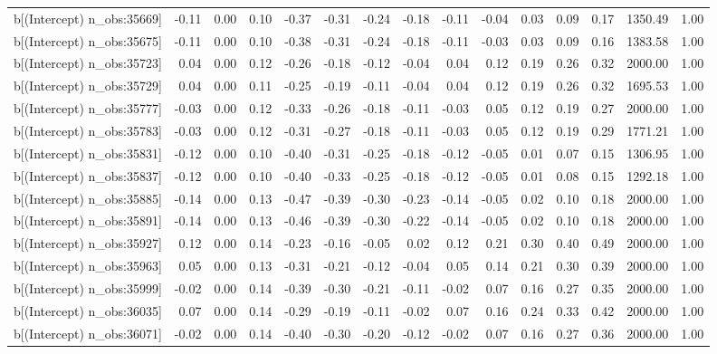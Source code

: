 \begin{table}[ht]
\begin{tabular}{rrrrrrrrrrrrrrr}
  b[(Intercept) n\_obs:35669] & -0.11 & 0.00 & 0.10 & -0.37 & -0.31 & -0.24 & -0.18 & -0.11 & -0.04 & 0.03 & 0.09 & 0.17 & 1350.49 & 1.00 \\ 
  b[(Intercept) n\_obs:35675] & -0.11 & 0.00 & 0.10 & -0.38 & -0.31 & -0.24 & -0.18 & -0.11 & -0.03 & 0.03 & 0.09 & 0.16 & 1383.58 & 1.00 \\ 
  b[(Intercept) n\_obs:35723] & 0.04 & 0.00 & 0.12 & -0.26 & -0.18 & -0.12 & -0.04 & 0.04 & 0.12 & 0.19 & 0.26 & 0.32 & 2000.00 & 1.00 \\ 
  b[(Intercept) n\_obs:35729] & 0.04 & 0.00 & 0.11 & -0.25 & -0.19 & -0.11 & -0.04 & 0.04 & 0.12 & 0.19 & 0.26 & 0.32 & 1695.53 & 1.00 \\ 
  b[(Intercept) n\_obs:35777] & -0.03 & 0.00 & 0.12 & -0.33 & -0.26 & -0.18 & -0.11 & -0.03 & 0.05 & 0.12 & 0.19 & 0.27 & 2000.00 & 1.00 \\ 
  b[(Intercept) n\_obs:35783] & -0.03 & 0.00 & 0.12 & -0.31 & -0.27 & -0.18 & -0.11 & -0.03 & 0.05 & 0.12 & 0.19 & 0.29 & 1771.21 & 1.00 \\ 
  b[(Intercept) n\_obs:35831] & -0.12 & 0.00 & 0.10 & -0.40 & -0.31 & -0.25 & -0.18 & -0.12 & -0.05 & 0.01 & 0.07 & 0.15 & 1306.95 & 1.00 \\ 
  b[(Intercept) n\_obs:35837] & -0.12 & 0.00 & 0.10 & -0.40 & -0.33 & -0.25 & -0.18 & -0.12 & -0.05 & 0.01 & 0.08 & 0.15 & 1292.18 & 1.00 \\ 
  b[(Intercept) n\_obs:35885] & -0.14 & 0.00 & 0.13 & -0.47 & -0.39 & -0.30 & -0.23 & -0.14 & -0.05 & 0.02 & 0.10 & 0.18 & 2000.00 & 1.00 \\ 
  b[(Intercept) n\_obs:35891] & -0.14 & 0.00 & 0.13 & -0.46 & -0.39 & -0.30 & -0.22 & -0.14 & -0.05 & 0.02 & 0.10 & 0.18 & 2000.00 & 1.00 \\ 
  b[(Intercept) n\_obs:35927] & 0.12 & 0.00 & 0.14 & -0.23 & -0.16 & -0.05 & 0.02 & 0.12 & 0.21 & 0.30 & 0.40 & 0.49 & 2000.00 & 1.00 \\ 
  b[(Intercept) n\_obs:35963] & 0.05 & 0.00 & 0.13 & -0.31 & -0.21 & -0.12 & -0.04 & 0.05 & 0.14 & 0.21 & 0.30 & 0.39 & 2000.00 & 1.00 \\ 
  b[(Intercept) n\_obs:35999] & -0.02 & 0.00 & 0.14 & -0.39 & -0.30 & -0.21 & -0.11 & -0.02 & 0.07 & 0.16 & 0.27 & 0.35 & 2000.00 & 1.00 \\ 
  b[(Intercept) n\_obs:36035] & 0.07 & 0.00 & 0.14 & -0.29 & -0.19 & -0.11 & -0.02 & 0.07 & 0.16 & 0.24 & 0.33 & 0.42 & 2000.00 & 1.00 \\ 
  b[(Intercept) n\_obs:36071] & -0.02 & 0.00 & 0.14 & -0.40 & -0.30 & -0.20 & -0.12 & -0.02 & 0.07 & 0.16 & 0.27 & 0.36 & 2000.00 & 1.00 \\ 

\end{tabular}
\end{table}
